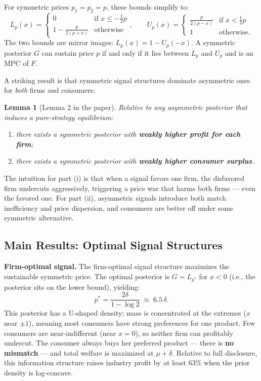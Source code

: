 \documentclass[12pt, a4paper]{article}
\newtheorem{lemma}{Lemma}
\begin{document}
For symmetric prices $p_1 = p_2 = p$, these bounds simplify to:
\begin{equation}
    L_p(x) = \begin{cases} 0 & \text{if } x \leq -\frac{1}{2}p \\ 1 - \frac{p}{2(p+x)} & \text{otherwise} \end{cases}, \qquad
    U_p(x) = \begin{cases} \frac{p}{2(p-x)} & \text{if } x < \frac{1}{2}p \\ 1 & \text{otherwise}. \end{cases}
\end{equation}
The two bounds are mirror images: $L_p(x) = 1 - U_p(-x)$. A symmetric posterior $G$ can sustain price $p$ if and only if it lies between $L_p$ and $U_p$ and is an MPC of $F$.

A striking result is that symmetric signal structures dominate asymmetric ones for \emph{both} firms and consumers:

\begin{lemma}[Lemma 2 in the paper]
Relative to any asymmetric posterior that induces a pure-strategy equilibrium:
\begin{enumerate}[nosep]
    \item[(i)] there exists a symmetric posterior with \textbf{weakly higher profit for each firm};
    \item[(ii)] there exists a symmetric posterior with \textbf{weakly higher consumer surplus}.
\end{enumerate}
\end{lemma}

The intuition for part (i) is that when a signal favors one firm, the disfavored firm undercuts aggressively, triggering a price war that harms both firms --- even the favored one. For part (ii), asymmetric signals introduce both match inefficiency and price dispersion, and consumers are better off under some symmetric alternative.

\subsection{Main Results: Optimal Signal Structures}

\textbf{Firm-optimal signal.} The firm-optimal signal structure maximizes the sustainable symmetric price. The optimal posterior is $G = L_{p^*}$ for $x < 0$ (i.e., the posterior sits on the lower bound), yielding:
\begin{equation}
    p^* = \frac{2\delta}{1 - \log 2} \;\approx\; 6.5\,\delta.
\end{equation}
This posterior has a U-shaped density: mass is concentrated at the extremes ($x$ near $\pm 1$), meaning most consumers have strong preferences for one product. Few consumers are near-indifferent (near $x = 0$), so neither firm can profitably undercut. The consumer always buys her preferred product --- there is \textbf{no mismatch} --- and total welfare is maximized at $\mu + \delta$. Relative to full disclosure, this information structure raises industry profit by at least 63\% when the prior density is log-concave.
\end{document}
